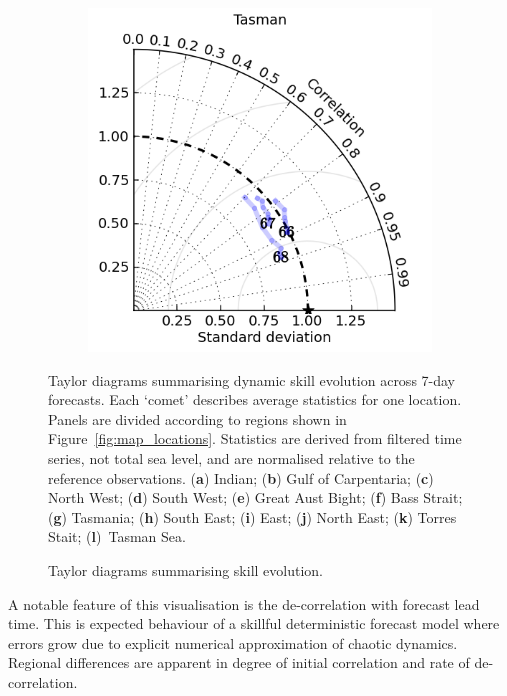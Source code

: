 \begin{figure}[H]
\begin{subfigure}{0.30\textwidth}
        \caption{}
    \end{subfigure}
    \begin{subfigure}{0.30\textwidth}
        \includegraphics[width=\textwidth]{figures/plots/taylor_diag_res_Tasman.png}
        \caption{}
    \end{subfigure}
    \caption{Taylor diagrams summarising skill evolution.}{Taylor diagrams summarising dynamic skill evolution across 7-day forecasts.
    Each `comet' describes average statistics for one location.
    Panels are divided according to regions shown in Figure~\ref{fig:map_locations}.
    Statistics are derived from filtered time series, not total sea level, and are normalised relative to the reference observations. (\textbf{a}) Indian; (\textbf{b}) Gulf of Carpentaria; (\textbf{c}) North West; (\textbf{d}) South West; (\textbf{e}) Great Aust Bight; (\textbf{f}) Bass Strait; (\textbf{g}) Tasmania; (\textbf{h}) South East; (\textbf{i}) East; (\textbf{j}) North East; (\textbf{k}) Torres Stait; (\textbf{l})~Tasman Sea. }
    \label{fig:taylors}
\end{figure}   
A notable feature of this visualisation is the de-correlation with forecast lead time.   
This is expected behaviour of a skillful deterministic forecast model where errors grow due to explicit numerical approximation of chaotic dynamics. 
Regional differences are apparent in degree of initial correlation and rate of de-correlation.

